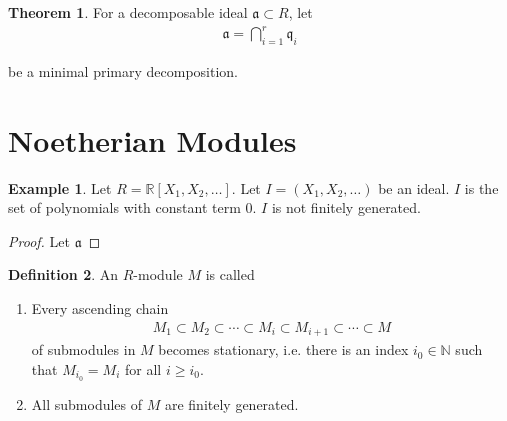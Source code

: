 \documentclass[a4paper]{book}
\theoremstyle{definition}
\newtheorem{definition}{Definition}[]
\newtheorem{example}{Example}[definition]
\newtheorem{theorem}[definition]{Theorem}
\begin{document}
\begin{thmbox}
    \begin{theorem}
        For a decomposable ideal \(\mathfrak{a} \subset R\), let
        \begin{align*}
            \mathfrak{a} = \bigcap_{i=1}^r \mathfrak{q}_i
        \end{align*}
    \end{theorem}
    be a minimal primary decomposition. 
\end{thmbox}




\newpage
\section{Noetherian Modules}

\begin{exmbox}
    \begin{example}
        Let \(R = \mathbb{R}[X_1, X_2, \ldots]\). Let \(I = (X_1, X_2, \ldots)\) be an ideal. \(I\) is the set of polynomials with constant term \(0\). \(I\) is not finitely generated.
    \end{example}
\end{exmbox}
\begin{proof}
    Let \(\mathfrak{a}\)
\end{proof}

\begin{defbox}
    \begin{definition}
        An \(R\)-module \(M\) is called
        \begin{enumerate}
            \item Every ascending chain
            \begin{align*}
                M_1 \subset M_2 \subset \cdots \subset M_i \subset M_{i + 1} \subset \cdots \subset M
            \end{align*}
            of submodules in \(M\) becomes stationary, i.e. there is an index \(i_0 \in \mathbb{N}\) such that \(M_{i_0} = M_i\) for all \(i \geq i_0\).
            \item All submodules of \(M\) are finitely generated.
        \end{enumerate}
    \end{definition}
\end{defbox}
\end{document}
